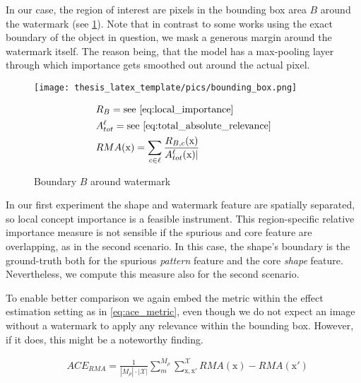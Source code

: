 In our case, the region of interest are pixels in the bounding box area $B$ around the watermark (see \cref{fig:bounding_box}). Note that in contrast to some works using the exact boundary of the object in question, we mask a generous margin around the watermark itself. The reason being, that the model has a max-pooling layer through which importance gets smoothed out around the actual pixel. 

\begin{figure}[t!]
\begin{minipage}[t]{0.45\textwidth}
    \vspace{-\topskip}
        \texttt{[image: thesis\_latex\_template/pics/bounding\_box.png]}
\end{minipage}
\begin{minipage}[t]{0.45\textwidth}
\begin{align}\displaystyle
& R_B = \mathrm{ see \ \cref{eq:local_importance}} \\
& A_{tot}^{\ell} = \mathrm{ see \ \cref{eq:total_absolute_relevance}} \\
& RMA(\mathrm{x}) = \sum_{c \in \ell}  \frac{
R_{B,c}(\mathrm{x})}{A_{tot}^{\ell}(\mathrm{x})|}
\end{align}
\end{minipage}
\caption{Boundary $B$ around watermark}
\label{fig:bounding_box}
\end{figure}

In our first experiment the shape and watermark feature are spatially separated, so local concept importance is a feasible instrument. This region-specific relative importance measure is not sensible if the spurious and core feature are overlapping, as in the second scenario. In this case, the shape's boundary is the ground-truth both for the spurious \textit{pattern} feature and the core \textit{shape} feature. Nevertheless, we compute this measure also for the second scenario.

To enable better comparison we again embed the metric within the effect estimation setting as in \cref{eq:ace_metric}, even though we do not expect an image without a watermark to apply any relevance within the bounding box. However, if it does, this might be a noteworthy finding.

\begin{align}\label{eq:ace_rma}
& ACE_{RMA} = \frac{1}{|M_\rho|\cdot |\mathcal{X}| }\sum_{m}^{M_{\rho}} \sum_{\mathrm{x,x'}}^{\mathcal{X}} RMA(\mathrm{x}) - RMA(\mathrm{x'})
\end{align}

